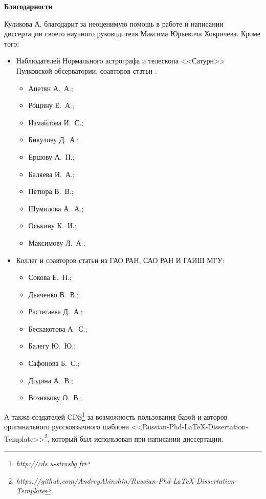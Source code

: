 \newpage
\begin{center}
\textbf{Благодарности}
\end{center}


Куликова А. благодарит за неоценимую помощь в работе и написании диссертации своего научного руководителя Максима Юрьевича Ховричева. Кроме того:
\begin{itemize}
  \item Наблюдателей Нормального астрографа и телескопа <<Сатурн>> Пулковской обсерватории, соавторов статьи \cite{2018AstL...44..103K}:
  \begin{itemize}
    \item Апетян А.~А.;
    \item Рощину Е.~А.;
    \item Измайлова И.~С.;
    \item Бикулову Д.~А.;
    \item Ершову А.~П.;
    \item Баляева И.~А.;
    \item Петюра В.~В.;
    \item Шумилова А.~А.;
    \item Оськину К.~И.;
    \item Максимову Л.~А.;
  \end{itemize}
  \item Коллег и соавторов статьи \cite{2016AstL...42..686K} из ГАО РАН, САО РАН И ГАИШ МГУ:
  \begin{itemize}
    \item Сокова Е.~Н.;
    \item Дьяченко В.~В.;
    \item Растегаева Д.~А.;
    \item Бескакотова А.~С.;
    \item Балегу Ю.~Ю.;
    \item Сафонова Б.~С.;
    \item Додина А.~В.;
    \item Вознякову О.~В.;
  \end{itemize}
\end{itemize}
А также создателей CDS\footnote{\textit{http://cds.u-strasbg.fr}} за возможность пользования базой и авторов оригинального русскоязычного шаблона <<Russian-Phd-LaTeX-Dissertation-Template>>\footnote{\textit{https://github.com/AndreyAkinshin/Russian-Phd-LaTeX-Dissertation-Template}}, который был использован при написании диссертации.
